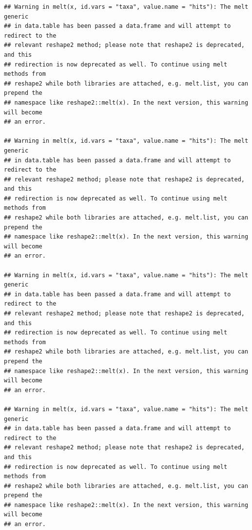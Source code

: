 \documentclass[
]{article}
\begin{document}
\begin{verbatim}
## Warning in melt(x, id.vars = "taxa", value.name = "hits"): The melt generic
## in data.table has been passed a data.frame and will attempt to redirect to the
## relevant reshape2 method; please note that reshape2 is deprecated, and this
## redirection is now deprecated as well. To continue using melt methods from
## reshape2 while both libraries are attached, e.g. melt.list, you can prepend the
## namespace like reshape2::melt(x). In the next version, this warning will become
## an error.

## Warning in melt(x, id.vars = "taxa", value.name = "hits"): The melt generic
## in data.table has been passed a data.frame and will attempt to redirect to the
## relevant reshape2 method; please note that reshape2 is deprecated, and this
## redirection is now deprecated as well. To continue using melt methods from
## reshape2 while both libraries are attached, e.g. melt.list, you can prepend the
## namespace like reshape2::melt(x). In the next version, this warning will become
## an error.

## Warning in melt(x, id.vars = "taxa", value.name = "hits"): The melt generic
## in data.table has been passed a data.frame and will attempt to redirect to the
## relevant reshape2 method; please note that reshape2 is deprecated, and this
## redirection is now deprecated as well. To continue using melt methods from
## reshape2 while both libraries are attached, e.g. melt.list, you can prepend the
## namespace like reshape2::melt(x). In the next version, this warning will become
## an error.

## Warning in melt(x, id.vars = "taxa", value.name = "hits"): The melt generic
## in data.table has been passed a data.frame and will attempt to redirect to the
## relevant reshape2 method; please note that reshape2 is deprecated, and this
## redirection is now deprecated as well. To continue using melt methods from
## reshape2 while both libraries are attached, e.g. melt.list, you can prepend the
## namespace like reshape2::melt(x). In the next version, this warning will become
## an error.
\end{verbatim}
\end{document}
